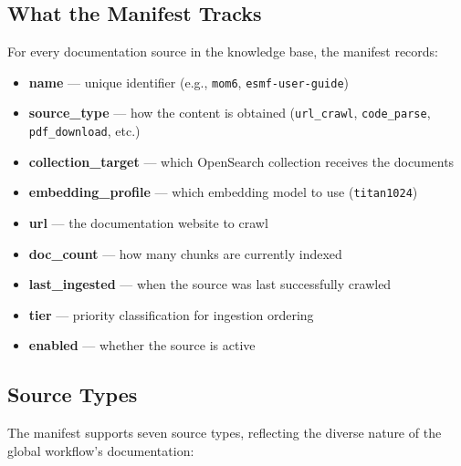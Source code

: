 \documentclass[11pt,letterpaper]{article}
\begin{document}
\subsection{What the Manifest Tracks}

For every documentation source in the knowledge base, the manifest
records:

\begin{itemize}[nosep]
    \item \textbf{name} — unique identifier (e.g., \texttt{mom6},
    \texttt{esmf-user-guide})
    \item \textbf{source\_type} — how the content is obtained
    (\texttt{url\_crawl}, \texttt{code\_parse}, \texttt{pdf\_download},
    etc.)
    \item \textbf{collection\_target} — which OpenSearch collection
    receives the documents
    \item \textbf{embedding\_profile} — which embedding model to use
    (\texttt{titan1024})
    \item \textbf{url} — the documentation website to crawl
    \item \textbf{doc\_count} — how many chunks are currently indexed
    \item \textbf{last\_ingested} — when the source was last
    successfully crawled
    \item \textbf{tier} — priority classification for ingestion ordering
    \item \textbf{enabled} — whether the source is active
\end{itemize}

\subsection{Source Types}

The manifest supports seven source types, reflecting the diverse nature
of the global workflow's documentation:
\end{document}
